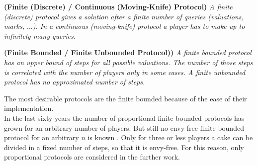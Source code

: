 \begin{defi}{\textbf{(Finite (Discrete) / Continuous (Moving-Knife) Protocol)}}
\newline \emph{A \emph{finite (discrete) protocol} gives a solution after a finite number of queries (valuations, marks, $\ldots$). In a \emph{continuous (moving-knife) protocol} a player has to make up to infinitely many queries.}
\end{defi}
\begin{defi}{\textbf{(Finite Bounded / Finite Unbounded Protocol))}}
\newline \emph{A \emph{finite bounded protocol} has an upper bound of steps for all possible valuations. The number of those steps is correlated with the number of players only in some cases. A \emph{finite unbounded protocol} has no approximated number of steps.}
\end{defi}
The most desirable protocols are the finite bounded because of the ease of their implementation. \\
In the last sixty years the number of proportional finite bounded protocols has grown for an arbitrary number of players. But still no envy-free finite bounded protocol for an arbitrary $n$ is known \cite{chen:truth}. Only for three or less players a cake can be divided in a fixed number of steps, so that it is envy-free. For this reason, only proportional protocols are considered in the further work.
